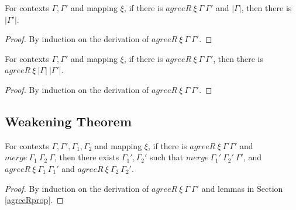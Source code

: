 \documentclass[sigplan,screen,review,anonymous]{acmart}
\newcommand{\pure}[1]{|#1|}
\newcommand{\mrg}[3]{merge\ {#1}\ {#2}\ {#3}}
\begin{document}
\begin{lemma}\label{agreerenpure}
  For contexts $\Gamma, \Gamma'$ and mapping $\xi$, if there is $agreeR\ \xi\ \Gamma\ \Gamma'$ and $\pure{\Gamma}$, then there is $\pure{\Gamma'}$.
\end{lemma}
\begin{proof}
  By induction on the derivation of $agreeR\ \xi\ \Gamma\ \Gamma'$.
\end{proof}

\begin{lemma}\label{agreerenrere}
  For contexts $\Gamma, \Gamma'$ and mapping $\xi$, if there is $agreeR\ \xi\ \Gamma\ \Gamma'$, then there is $agreeR\ \xi\ \pure{\Gamma}\ \pure{\Gamma'}$.
\end{lemma}
\begin{proof}
  By induction on the derivation of $agreeR\ \xi\ \Gamma\ \Gamma'$.
\end{proof}

\subsection{Weakening Theorem}

\begin{lemma}\label{mergeagreereninv}
  For contexts $\Gamma, \Gamma', \Gamma_1, \Gamma_2$ and mapping $\xi$, if there is $agreeR\ \xi\ \Gamma\ \Gamma'$ and $\mrg{\Gamma_1}{\Gamma_2}{\Gamma}$, then there exists $\Gamma_1', \Gamma_2'$ such that $\mrg{\Gamma_1'}{\Gamma_2'}{\Gamma'}$, and $agreeR\ \xi\ \Gamma_1\ \Gamma_1'$ and $agreeR\ \xi\ \Gamma_2\ \Gamma_2'$.
\end{lemma}
\begin{proof}
  By induction on the derivation of $agreeR\ \xi\ \Gamma\ \Gamma'$ and lemmas in Section \ref{agreeRprop}.
\end{proof}
\end{document}
